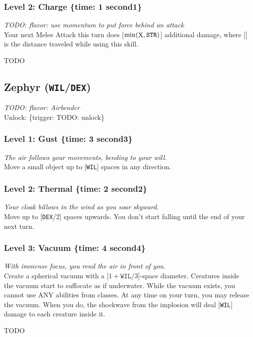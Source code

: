 \documentclass[12pt]{article}
\newcommand{\STR}{\texttt{STR}}
\newcommand{\DEX}{\texttt{DEX}}
\newcommand{\WIL}{\texttt{WIL}}
\newcommand{\X}{\text{{\lower 0.2mm \hbox{X}}}}
\newcommand{\TIME}[1]{\{time: #1 second\if1#1{}\else{s}\fi\}}
\newcommand{\TRIG}[1]{\{trigger: #1\}}
\newcommand{\Class}[4]{\pagebreak\subsection{#1 (#2)}\label{#1}\textit{#3}\\[1mm]Unlock: \TRIG{#4}}
\newcommand{\Skill}[5]{\subsubsection{Level #1: #2 #3}\textit{#4}\\[1mm]#5}
\begin{document}
\Skill{2}{Charge}{\TIME{1}}
{TODO: flavor: use momentum to put force behind an attack}
{Your next Melee Attack this turn does [$\min(\X, \STR)$] additional damage, where [\X] is the distance traveled while using this skill.}

TODO

%

%

%

%

%

%

%

%

%

%

%

%

%

%

%

%

%

%

%

%

\Class{Zephyr}{\WIL/\DEX}
{TODO: flavor: Airbender}
{TODO: unlock}

\Skill{1}{Gust}{\TIME{3}}
{The air follows your movements, bending to your will.}
{Move a small object up to [\WIL] spaces in any direction.}

\Skill{2}{Thermal}{\TIME{2}}
{Your cloak billows in the wind as you soar skyward.}
{Move up to [\DEX/2] spaces upwards. You don't start falling until the end of your next turn.}

\Skill{3}{Vacuum}{\TIME{4}}
{With immense focus, you rend the air in front of you.}
{Create a spherical vacuum with a [$1 + \WIL / 3$]-space diameter. Creatures inside the vacuum start to suffocate as if underwater. While the vacuum exists, you cannot use ANY abilities from classes. At any time on your turn, you may release the vacuum. When you do, the shockwave from the implosion will deal [\WIL] damage to each creature inside it.}

TODO

%

%

%

%

%

%

%

%

%

%
\end{document}
